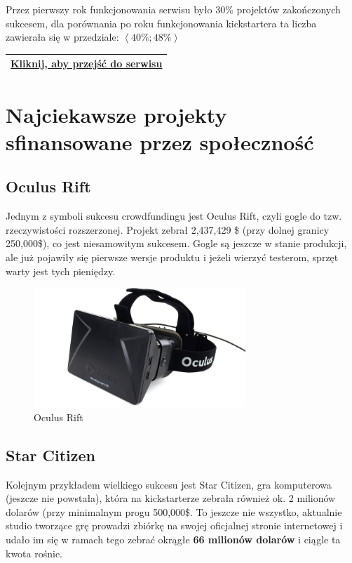 \documentclass[12pt, a4paper]{article}
\begin{document}
Przez pierwszy rok funkcjonowania serwisu było 30\% projektów zakończonych sukcesem, dla porównania po roku funkcjonowania kickstartera ta liczba zawierała się w przedziale: $\left\langle 40\%;48\% \right\rangle$

\begin{center}
\begin{tabular}{|c|} \hline
\href{www.wspieram.to}{Kliknij, aby przejść do serwisu}\\ \hline
\end{tabular}
\end{center}

\section{Najciekawsze projekty sfinansowane przez społeczność}
\label{sec:npj}

\subsection{Oculus Rift}
\label{sec:or}

Jednym z symboli sukcesu crowdfundingu jest Oculus Rift, czyli gogle do tzw. rzeczywistości rozszerzonej. Projekt zebrał 2,437,429 \$ (przy dolnej granicy 250,000\$), co jest niesamowitym sukcesem. Gogle są jeszcze w stanie produkcji, ale już pojawiły się pierwsze wersje produktu i jeżeli wierzyć testerom, sprzęt warty jest tych pieniędzy.

\begin{figure}[ht]
\centering
\includegraphics[width=8cm]{oc}
\caption{Oculus Rift}
\label{fig:obrazek k}
\end{figure}

\subsection{Star Citizen}
\label{sec:sc}

Kolejnym przykładem wielkiego sukcesu jest Star Citizen, gra komputerowa (jeszcze nie powstała), która na kickstarterze zebrała również ok. 2 milionów dolarów (przy minimalnym progu 500,000\$. To jeszcze nie wszystko, aktualnie studio tworzące grę prowadzi zbiórkę na swojej oficjalnej stronie internetowej i udało im się w ramach tego zebrać okrągłe \textbf{66 milionów dolarów} i ciągle ta kwota rośnie.
\end{document}

